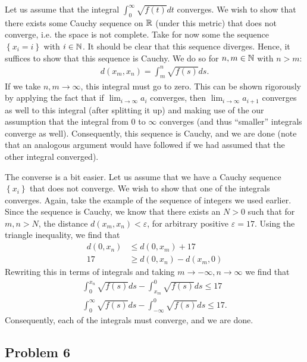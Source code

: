 \documentclass{../../mathnotes}
\begin{document}
Let us assume that the integral $\int_0^\infty\sqrt{f(t)}dt$ converges.
We wish to show that there exists some Cauchy sequence on $\mathbb{R}$ (under this metric) that does not converge, i.e. the space
is not complete. Take for now some the sequence $\left\{ x_i=i \right\}$ with $i\in\mathbb{N}$. It should be clear that this sequence
diverges. Hence, it suffices to show that this sequence is Cauchy. We do so for $n,m\in\mathbb{N}$ with $n>m$:
\begin{align*}
    d(x_m,x_n)=\int_m^n\sqrt{f(s)} ds.
\end{align*}
If we take $n,m\to\infty$, this integral must go to zero. This can be shown rigorously by applying the fact that
if $\lim_{i\to\infty}a_i$ converges, then $\lim_{i\to\infty}a_{i+1}$ converges as well to this integral (after splitting it up)
and making use of the our assumption that the integral from 0 to $\infty$ converges (and thus ``smaller'' integrals converge as well).
Consequently, this sequence is Cauchy, and we are done (note that an analogous argument would have followed if we had assumed that
the other integral converged).

The converse is a bit easier. Let us assume that we have a Cauchy sequence $\left\{ x_i \right\}$ that does not converge. We
wish to show that one of the integrals converges. 
Again, take the example of the sequence of integers we used earlier. Since the sequence is Cauchy, we know that there exists an $N>0$
such that for $m,n>N$, the distance $d(x_m,x_n)<\varepsilon$, for arbitrary positive $\varepsilon=17$. Using the triangle
inequality, we find that
\begin{align*}
    d(0,x_n)&\leq d(0,x_m)+17\\
    17&\geq d(0,x_n)-d(x_m,0)
\end{align*}
Rewriting this in terms of integrals and taking $m\to-\infty,n\to\infty$ we find that
\begin{align*}
    \int_0^{x_n}\sqrt{f(s)} ds-\int_{x_m}^0\sqrt{f(s)} ds\leq 17\\
    \int_0^{\infty}\sqrt{f(s)} ds-\int_{-\infty}^0\sqrt{f(s)} ds\leq 17.
\end{align*}
Consequently, each of the integrals must converge, and we are done.



\subsection*{Problem 6}
\end{document}
